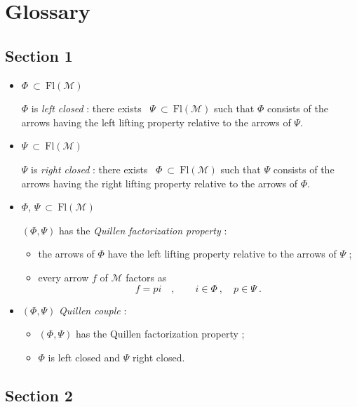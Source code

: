 \documentclass[11pt]{article}
\newcommand{\printedpage}[1]{\marginpar{\footnotesize p.~#1}}
\newcommand{\Fl}{\mathrm{Fl}}
\begin{document}
\clearpage

\printedpage{58}

\setcounter{footnote}{0}
\renewcommand{\thefootnote}{\fnsymbol{footnote}}
\section*{Glossary}

\subsection*{Section 1}

\begin{itemize}
\item $\Phi \ \subset\ \Fl(\mathcal{M})$

$\Phi$ is \textit{left closed} : there exists \ $\Psi \ \subset\ \Fl(\mathcal{M})$ such that $\Phi$ consists of the arrows having the left lifting property relative to the arrows of $\Psi$.

\item $\Psi \ \subset\ \Fl(\mathcal{M})$

$\Psi$ is \textit{right closed} : there exists \ $\Phi \ \subset\ \Fl(\mathcal{M})$ such that $\Psi$ consists of the arrows having the right lifting property relative to the arrows of $\Phi$.

\item $\Phi$, $\Psi \ \subset\ \Fl(\mathcal{M})$

$(\Phi, \Psi)$ has the \textit{Quillen factorization property} :
\begin{itemize}
\item[a)] the arrows of $\Phi$ have the left lifting property relative to the arrows of $\Psi$ ;
\item[b)] every arrow $f$ of $\mathcal{M}$ factors as
\[
f = pi \quad , \qquad i \in \Phi \ , \quad p \in \Psi \ .
\]
\end{itemize}

\item $(\Phi, \Psi)$ \textit{Quillen couple} :
\begin{itemize}
\item[a)] $(\Phi, \Psi)$ has the Quillen factorization property ;
\item[b)] $\Phi$ is left closed and $\Psi$ right closed.
\end{itemize}
\end{itemize}

\subsection*{Section 2}
\end{document}
